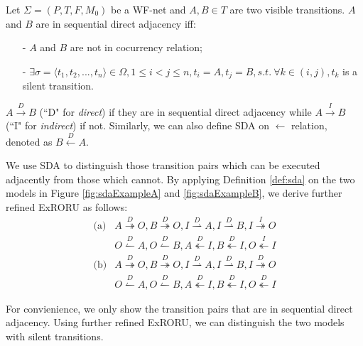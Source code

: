 \documentclass[dvips,...]{llncs}
\begin{document}
\begin{definition}\label{def:sda}
Let $\Sigma=(P,T,F,M_{0})$ be a WF-net and $A,B\in T$ are two visible transitions. $A$ and $B$ are in sequential direct adjacency iff:
	\begin{itemize}
		\item[-] $A$ and $B$ are not in cocurrency relation;
		\item[-] $\exists\sigma=\langle t_{1},t_{2},...,t_{n}\rangle\in\Omega,1\leq i<j\leq n,t_{i}=A,t_{j}=B,s.t.~\forall k\in(i,j),t_{k}$ is a silent transition.
	\end{itemize}
$A\overset{D}{\rightarrow}B$ (``D" for \textit{direct}) if they are in sequential direct adjacency while $A\overset{I}{\rightarrow}B$ (``I" for \textit{indirect}) if not. Similarly, we can also define SDA on $\leftarrow$ relation, denoted as $B\overset{D}{\leftarrow}A$.
\end{definition}

We use SDA to distinguish those transition pairs which can be executed adjacently from those which cannot. By applying Definition \ref{def:sda} on the two models in Figure \ref{fig:sdaExampleA} and \ref{fig:sdaExampleB}, we derive further refined ExRORU as follows:
\begin{displaymath}
	\begin{aligned}
		\text{(a)} & A\overset{D}{\twoheadrightarrow}O, B\overset{D}{\twoheadrightarrow}O, I\overset{D}{\rightharpoonup}A, I\overset{D}{\rightharpoonup}B, I\overset{I}{\twoheadrightarrow}O\\
		& O\overset{D}{\leftharpoonup}A, O\overset{D}{\leftharpoonup}B, A\overset{D}{\twoheadleftarrow}I, B\overset{D}{\twoheadleftarrow}I, O\overset{I}{\twoheadleftarrow}I\\
		\text{(b)} & A\overset{D}{\twoheadrightarrow}O, B\overset{D}{\twoheadrightarrow}O, I\overset{D}{\rightharpoonup}A, I\overset{D}{\rightharpoonup}B, I\overset{D}{\twoheadrightarrow}O\\
		& O\overset{D}{\leftharpoonup}A, O\overset{D}{\leftharpoonup}B, A\overset{D}{\twoheadleftarrow}I, B\overset{D}{\twoheadleftarrow}I, O\overset{D}{\twoheadleftarrow}I
	\end{aligned}
\end{displaymath}

For convienience, we only show the transition pairs that are in sequential direct adjacency. Using further refined ExRORU, we can distinguish the two models with silent transitions.

\end{document}
